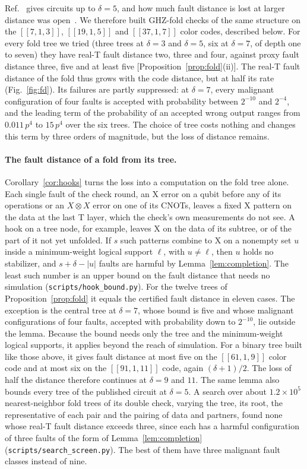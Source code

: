 \documentclass[aps,prl,reprint,twocolumn,amsmath,amssymb,floatfix,nofootinbib,superscriptaddress]{revtex4-2}
\theoremstyle{definition}
\theoremstyle{remark}
\begin{document}
Ref.~\cite{cultivation} gives circuits up to $\delta=5$, and how much fault distance is lost at larger distance was open~\cite{chan}. We therefore built GHZ-fold checks of the same structure on the $[[7,1,3]]$, $[[19,1,5]]$ and $[[37,1,7]]$ color codes, described below. For every fold tree we tried (three trees at $\delta=3$ and $\delta=5$, six at $\delta=7$, of depth one to seven) they have real-T fault distance two, three and four, against proxy fault distance three, five and at least five [Proposition~\ref{prop:fold}(ii)]. The real-T fault distance of the fold thus grows with the code distance, but at half its rate (Fig.~\ref{fig:fd}). Its failures are partly suppressed: at $\delta=7$, every malignant configuration of four faults is accepted with probability between $2^{-10}$ and $2^{-4}$, and the leading term of the probability of an accepted wrong output ranges from $0.011\,p^4$ to $15\,p^4$ over the six trees. The choice of tree costs nothing and changes this term by three orders of magnitude, but the loss of distance remains.

\paragraph*{The fault distance of a fold from its tree.}
Corollary~\ref{cor:hooks} turns the loss into a computation on the fold tree alone. Each single fault of the check round, an X error on a qubit before any of its operations or an $X\otimes X$ error on one of its CNOTs, leaves a fixed X pattern on the data at the last T layer, which the check's own measurements do not see. A hook on a tree node, for example, leaves X on the data of its subtree, or of the part of it not yet unfolded. If $s$ such patterns combine to X on a nonempty set $u$ inside a minimum-weight logical support $\ell$, with $u\neq\ell$, then $u$ holds no stabilizer, and $s+\delta-|u|$ faults are harmful by Lemma~\ref{lem:completion}. The least such number is an upper bound on the fault distance that needs no simulation (\texttt{scripts/hook\_bound.py}). For the twelve trees of Proposition~\ref{prop:fold} it equals the certified fault distance in eleven cases. The exception is the central tree at $\delta=7$, whose bound is five and whose malignant configurations of four faults, accepted with probability down to $2^{-10}$, lie outside the lemma. Because the bound needs only the tree and the minimum-weight logical supports, it applies beyond the reach of simulation. For a binary tree built like those above, it gives fault distance at most five on the $[[61,1,9]]$ color code and at most six on the $[[91,1,11]]$ code, again $(\delta+1)/2$. The loss of half the distance therefore continues at $\delta=9$ and $11$. The same lemma also bounds every tree of the published circuit at $\delta=5$. A search over about $1.2\times10^5$ nearest-neighbor fold trees of its double check, varying the tree, its root, the representative of each pair and the pairing of data and partners, found none whose real-T fault distance exceeds three, since each has a harmful configuration of three faults of the form of Lemma~\ref{lem:completion} (\texttt{scripts/search\_screen.py}). The best of them have three malignant fault classes instead of nine.
\end{document}
